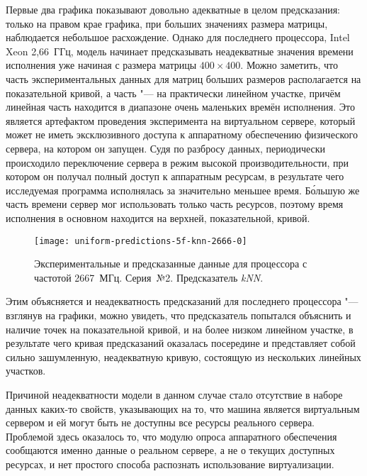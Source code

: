 Первые два графика показывают довольно адекватные в целом предсказания: только на правом крае графика, при больших значениях размера матрицы, наблюдается небольшое расхождение. Однако для последнего процессора, Intel Xeon 2,66~ГГц, модель начинает предсказывать неадекватные значения времени исполнения уже начиная с размера матрицы $400 \times 400$. Можно заметить, что часть экспериментальных данных для матриц больших размеров располагается на показательной кривой, а часть "--- на практически линейном участке, причём линейная часть находится в диапазоне очень маленьких времён исполнения. Это является артефактом проведения эксперимента на виртуальном сервере, который может не иметь эксклюзивного доступа к аппаратному обеспечению физического сервера, на котором он запущен. Судя по разбросу данных, периодически происходило переключение сервера в режим высокой производительности, при котором он получал полный доступ к аппаратным ресурсам, в результате чего исследуемая программа исполнялась за значительно меньшее время. Б\'{о}льшую же часть времени сервер мог использовать только часть ресурсов, поэтому время исполнения в основном находится на верхней, показательной, кривой.

\begin{figure}[H]
    \begin{center}
        \texttt{[image: uniform-predictions-5f-knn-2666-0]}
        \caption{Экспериментальные и предсказанные данные для процессора с частотой 2667~МГц. Серия~№2. Предсказатель \textit{kNN}.}
        \label{img:uniform-predictions-5f-knn-2666-0}
    \end{center}
\end{figure}

Этим объясняется и неадекватность предсказаний для последнего процессора "--- взглянув на графики, можно увидеть, что предсказатель попытался объяснить и наличие точек на показательной кривой, и на более низком линейном участке, в результате чего кривая предсказаний оказалась посередине и представляет собой сильно зашумленную, неадекватную кривую, состоящую из нескольких линейных участков.

Причиной неадекватности модели в данном случае стало отсутствие в наборе данных каких-то свойств, указывающих на то, что машина является виртуальным сервером и ей могут быть не доступны все ресурсы реального сервера. Проблемой здесь оказалось то, что модулю опроса аппаратного обеспечения сообщаются именно данные о реальном сервере, а не о текущих доступных ресурсах, и нет простого способа распознать использование виртуализации.


